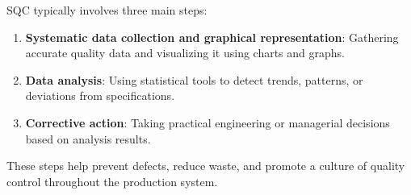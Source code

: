 \documentclass[twoside]{book}
\begin{document}
SQC typically involves three main steps:
\begin{enumerate}
    \item \textbf{Systematic data collection and graphical representation}: Gathering accurate quality data and visualizing it using charts and graphs.
    \item \textbf{Data analysis}: Using statistical tools to detect trends, patterns, or deviations from specifications.
    \item \textbf{Corrective action}: Taking practical engineering or managerial decisions based on analysis results.
\end{enumerate}

These steps help prevent defects, reduce waste, and promote a culture of quality control throughout the production system.

%
%
%
%
%
\end{document}
